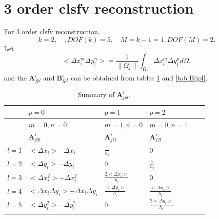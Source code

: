 \documentclass[review]{elsarticle}
\begin{document}
\section {3 order clsfv reconstruction}
	For 3 order clsfv reconstruction,
	\begin{equation}\label{3orderParameters}
		k=2, \quad, DOF(k)=5, \quad M=k-1=1, DOF(M)=2.
	\end{equation}
	Let
	\begin{equation}\label{avgj}
		<\Delta x^m_i\Delta y^n_i>=\frac{1}{\|\Omega_j\|}\int_{\Omega_j}\Delta x^m_i\Delta y^n_id\Omega,
	\end{equation}
	and the $\bm{A}^i_{jpl}$ and $\bm{B}^i_{jpl}$ can be obtained from tables \ref{tab:Aijpl} and \ref{tab:Bijpl}.
	\begin{table}[!htp]
		\centering
		\caption{\label{tab:Aijpl} Summary of $\bm{A}^i_{jpl}$.}
		\begin{threeparttable}
			\begin{tabular}{p{100pt} p{100pt}<{\centering} p{80pt}<{\centering} p{80pt}<{\centering} p{80pt}<{\centering} p{80pt}<{\centering}}
				\hline
				\hline
				 & $p=0$ & $p=1$ & $p=2$ \\
				\hline
				 & $m=0, n=0$ & $m=1, n=0$ & $m=0, n=1$ \\
				\hline
				& $\bm{A}^i_{j0l}$ & $\bm{A}^i_{j1l}$ & $\bm{A}^i_{j2l}$ \\
				\hline
				$l=1$ & $<\Delta x_i>-\overline{\Delta x_i}$ & $\frac{1}{h_i}$ & $0$ \\
				
				$l=2$ & $<\Delta y_i>-\overline{\Delta y_i}$ & $0$ & $\frac{1}{h_i}$\\
				
				$l=3$ & $<\Delta x^2_i>-\overline{\Delta x^2_i}$ & $\frac{2<\Delta x_i>}{h_i}$ & $0$\\
				
				$l=4$ & $<\Delta x_i\Delta y_i>-\overline{\Delta x_i\Delta y_i}$ & $\frac{<\Delta y_i>}{h_i}$ & $\frac{<\Delta x_i>}{h_i}$\\
				
				$l=5$ & $<\Delta y^2_i>-\overline{\Delta y^2_i}$ & $0$ & $\frac{2<\Delta y_i>}{h_i}$\\
				\lasthline
			\end{tabular}
		\end{threeparttable}
	\end{table}
\end{document}
